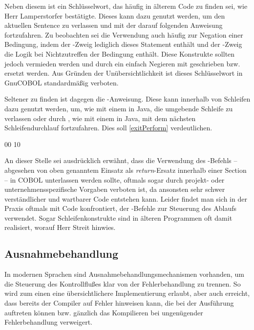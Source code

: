 Neben diesem ist  ein Schlüsselwort, das häufig in älterem Code zu finden sei, wie Herr Lamperstorfer bestätigte. Dieses kann dazu genutzt werden, um den aktuellen Sentence zu verlassen und mit der darauf folgenden Anweisung fortzufahren. Zu beobachten sei die Verwendung auch häufig zur Negation einer Bedingung, indem der -Zweig lediglich dieses Statement enthält und der -Zweig die Logik bei Nichtzutreffen der Bedingung enthält. Diese Konstrukte sollten jedoch vermieden werden und durch ein einfach Negieren mit  geschrieben bzw. ersetzt werden. Aus Gründen der Unübersichtlichkeit ist dieses Schlüsselwort in GnuCOBOL standardmäßig verboten. 

Seltener zu finden ist dagegen die -Anweisung. Diese kann innerhalb von Schleifen dazu genutzt werden, um, wie mit einem  in Java, die umgebende Schleife zu verlassen oder durch , wie mit einem  in Java, mit dem nächsten Schleifendurchlauf fortzufahren. Dies soll \autoref{exitPerform} verdeutlichen.

\sepCodeAndOutputCheck
\begin{shellwindow}
00
10
\end{shellwindow}

An dieser Stelle sei ausdrücklich erwähnt, dass die Verwendung des -Befehls -- abgesehen von oben genanntem Einsatz als \textit{return}-Ersatz innerhalb einer Section -- in COBOL unterlassen werden sollte, oftmals sogar durch projekt- oder unternehmensspezifische Vorgaben verboten ist, da ansonsten sehr schwer verständlicher und wartbarer Code entstehen kann. Leider findet man sich in der Praxis oftmals mit Code konfrontiert, der -Befehle zur Steuerung des Ablaufs verwendet. Sogar Schleifenkonstrukte sind in älteren Programmen oft damit realisiert, worauf Herr Streit hinwies.

\subsection{Ausnahmebehandlung}

In modernen Sprachen sind Ausnahmebehandlungsmechanismen vorhanden, um die Steuerung des Kontrollflußes klar von der Fehlerbehandlung zu trennen. So wird zum einen eine übersichtlichere Implementierung erlaubt, aber auch erreicht, dass bereits der Compiler auf Fehler hinweisen kann, die bei der Ausführung auftreten können bzw. gänzlich das Kompilieren bei ungenügender Fehlerbehandlung verweigert.

